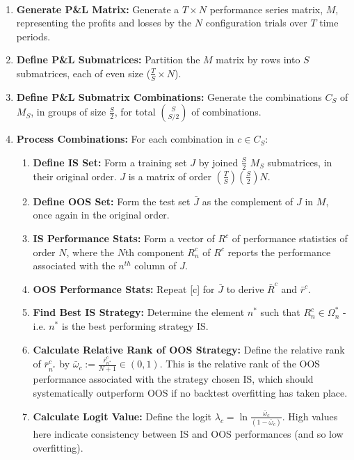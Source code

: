 \documentclass[a4paper,11pt,oneside]{article}
\theoremstyle{plain}
\theoremstyle{definition}
\begin{document}
	\begin{algorithm}[H]
		\texttt{\\}
		
		\begin{enumerate}
			\item \textbf{Generate P\&L Matrix:} Generate a $T\times N$ performance series matrix, $M$, representing the profits and losses by the $N$ configuration trials over $T$ time periods.
			\item \textbf{Define P\&L Submatrices:}  Partition the $M$ matrix by rows into $S$ submatrices, each of even size ($\frac{T}{S}\times N$).
			\item \textbf{Define P\&L Submatrix Combinations:} Generate the combinations $C_S$ of $M_S$, in groups of size $\frac{S}{2}$, for total $\binom{S}{S/2}$ of combinations.
			\item \textbf{Process Combinations:} For each combination in $c \in C_S$:
			\begin{enumerate}
				\item \textbf{Define IS Set:} Form a training set $J$ by joined $\frac{S}{2}$ $M_S$ submatrices, in their original order. $J$ is a matrix of order $\left(\frac{T}{S}\right)\left(\frac{S}{2}\right) N$.
				\item \textbf{Define OOS Set:}  Form the test set $\bar{J}$ as the complement of $J$ in $M$, once again in the original order.
				\item \textbf{IS Performance Stats:} Form a vector of $R^c$ of performance statistics of order $N$, where the $N$th component $R_n^c$ of $R^c$ reports the performance associated with the $n^{th}$ column of $J$.
				\item \textbf{OOS Performance Stats:}  Repeat [c] for $\bar{J}$ to derive $\bar{R}^c$ and $\bar{r}^c$.
				\item \textbf{Find Best IS Strategy:} Determine the element $n^*$ such that $R^c_n \in \Omega^*_n$ - i.e. $n^*$ is the best performing strategy IS.
				\item \textbf{Calculate Relative Rank of OOS Strategy:} Define the relative rank of $\bar{r}^c_{n^*}$ by $\bar{\omega}_c := \frac{\bar{r}^c_{n^*}}{N +1} \in (0,1)$. This is the relative rank of the OOS performance associated with the strategy chosen IS, which should systematically outperform OOS if no backtest overfitting has taken place.
				\item \textbf{Calculate Logit Value:} Define the logit $\lambda_c = \ln \frac{\bar{\omega}_c}{(1-\bar{\omega}_c)}$. High values here indicate consistency between IS and OOS performances (and so low overfitting).

\end{enumerate}
\end{enumerate}
\end{algorithm}
\end{document}
